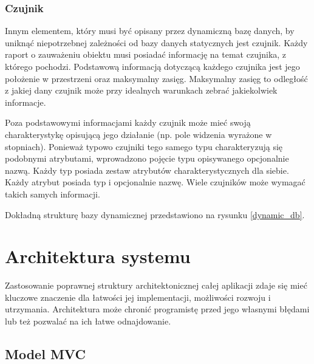 {\subsubsection{Czujnik}
\par{
Innym elementem, który musi być opisany przez dynamiczną bazę danych, by uniknąć niepotrzebnej zależności od bazy danych statycznych jest czujnik. Każdy raport o zauważeniu obiektu musi posiadać informację na temat czujnika, z którego pochodzi. Podstawową informacją dotyczącą każdego czujnika jest jego położenie w przestrzeni oraz maksymalny zasięg. Maksymalny zasięg to odległość z jakiej dany czujnik może przy idealnych warunkach zebrać jakiekolwiek informacje.
}
\par{
Poza podstawowymi informacjami każdy czujnik może mieć swoją charakterystykę opisującą jego działanie (np. pole widzenia wyrażone w stopniach). Ponieważ typowo czujniki tego samego typu charakteryzują się podobnymi atrybutami, wprowadzono pojęcie typu opisywanego opcjonalnie nazwą. Każdy typ posiada zestaw atrybutów charakterystycznych dla siebie. Każdy atrybut posiada typ i opcjonalnie nazwę. Wiele czujników może wymagać takich samych informacji.
}
\par{
Dokładną strukturę bazy dynamicznej przedstawiono na rysunku \ref{dynamic_db}.
}


\section[Architektura systemu][Architektura systemu]{Architektura systemu}
\par{
Zastosowanie poprawnej struktury architektonicznej całej aplikacji zdaje się mieć kluczowe znaczenie dla łatwości jej implementacji, możliwości rozwoju i utrzymania. Architektura może chronić programistę przed jego własnymi błędami lub też pozwalać na ich łatwe odnajdowanie.
}
\subsection{Model MVC}
}
